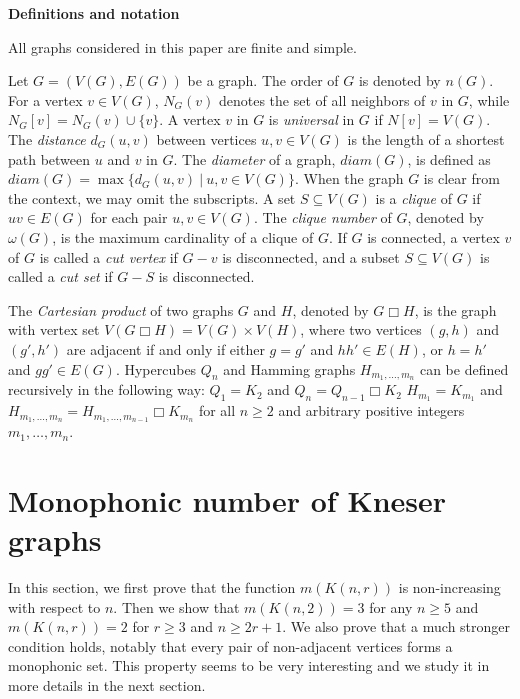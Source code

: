 \documentclass[a4paper,11pt]{article}
\begin{document}
\medskip

{\bf{Definitions and notation}}

\medskip

All graphs considered in this paper are finite and simple.

Let $G=(V(G),E(G))$ be a graph. The order of $G$ is denoted by $n(G)$. For a vertex $v \in V(G)$, $N_G(v)$ denotes the set of all neighbors of $v$ in $G$, while $N_G[v]=N_G(v) \cup \{v\}$. 
A vertex $v$ in $G$ is {\em universal} in $G$ if $N[v]=V(G)$.
The \emph{distance} $d_G(u,v)$ between vertices $u,v\in V(G)$ is the length of a shortest path between $u$ and $v$ in $G.$  
The \emph{diameter} of a graph, $diam(G)$, is defined as  $\displaystyle diam(G)=\max\lbrace d_G(u,v)~|~ u,v\in V(G)\rbrace$.
When the graph $G$ is clear from the context, we may omit the subscripts.
A set $S\subseteq V(G)$ is a \emph{clique} of $G$ if $uv\in E(G)$ for each pair $u,v\in V(G)$. The \emph{clique number} of $G$, denoted by $\omega(G)$, is the maximum cardinality of a clique of $G$.
If $G$ is connected, a vertex $v$ of $G$ is called a \emph{cut vertex} if $G-v$ is disconnected, and a subset $S \subseteq V(G)$ is called a \emph{cut set} if $G-S$ is disconnected.

The \emph{Cartesian product} of two graphs $G$ and $H$, denoted by $G \Box H$, is the graph with vertex set $V(G \Box H) = V(G) \times V(H)$, where two vertices $(g,h)$ and $(g',h')$ are adjacent if and only if either $g = g'$ and $hh' \in E(H)$, or $h = h'$ and $gg' \in E(G)$. Hypercubes $Q_n$ and Hamming graphs $H_{m_1,\ldots ,m_n}$ can be defined recursively in the following way: $Q_1=K_2$ and $Q_n=Q_{n-1}\Box K_2$ $H_{m_1}=K_{m_1}$ and $H_{m_1,\ldots , m_n}=H_{m_1,\ldots ,m_{n-1}}\Box K_{m_n}$ for all $n \geq 2$ and arbitrary positive integers $m_1,\ldots ,m_n$.



\section{Monophonic number of Kneser graphs}\label{s:Kneser}

In this section, we first prove that the function $m(K(n,r))$ is non-increasing with respect to $n$. Then we show that $m(K(n,2))=3$ for any $n\geq 5$ and $m(K(n,r))=2$ for $r \geq 3$ and $n \geq 2r+1$. We also prove that a much stronger condition holds, notably that every pair of non-adjacent vertices forms a monophonic set. This property seems to be very interesting and we study it in more details in the next section. 
\end{document}

